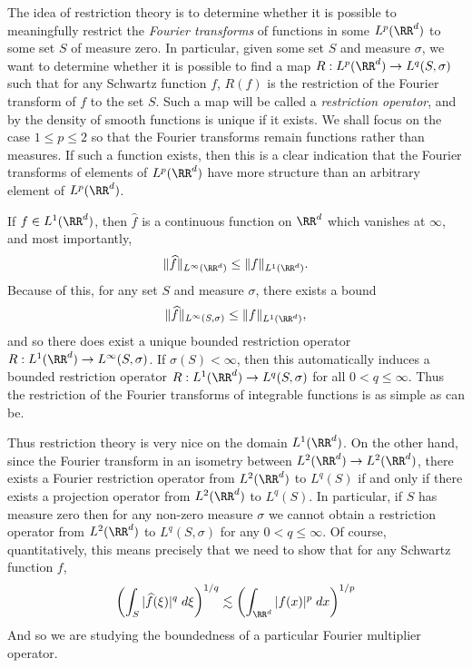 The idea of restriction theory is to determine whether it is possible to meaningfully restrict the \emph{Fourier transforms} of functions in some $L^p(\RR^d)$ to some set $S$ of measure zero. In particular, given some set $S$ and measure $\sigma$, we want to determine whether it is possible to find a map $R: L^p(\RR^d) \to L^q(S,\sigma)$ such that for any Schwartz function $f$, $R(f)$ is the restriction of the Fourier transform of $f$ to the set $S$. Such a map will be called a \emph{restriction operator}, and by the density of smooth functions is unique if it exists. We shall focus on the case $1 \leq p \leq 2$ so that the Fourier transforms remain functions rather than measures. If such a function exists, then this is a clear indication that the Fourier transforms of elements of $L^p(\RR^d)$ have more structure than an arbitrary element of $L^p(\RR^d)$.

\begin{example}
  If $f \in L^1(\RR^d)$, then $\widehat{f}$ is a continuous function on $\RR^d$ which vanishes at $\infty$, and most importantly,
  \[ \| \widehat{f} \|_{L^\infty(\RR^d)} \leq \| f \|_{L^1(\RR^d)}. \]
  Because of this, for any set $S$ and measure $\sigma$, there exists a bound
  \[ \| \widehat{f} \|_{L^\infty(S,\sigma)} \leq \| f \|_{L^1(\RR^d)}, \]
  and so there does exist a unique bounded restriction operator $R: L^1(\RR^d) \to L^\infty(S,\sigma)$. If $\sigma(S) < \infty$, then this automatically induces a bounded restriction operator $R: L^1(\RR^d) \to L^q(S,\sigma)$ for all $0 < q \leq \infty$. Thus the restriction of the Fourier transforms of integrable functions is as simple as can be.
\end{example}

Thus restriction theory is very nice on the domain $L^1(\RR^d)$. On the other hand, since the Fourier transform in an isometry between $L^2(\RR^d) \to L^2(\RR^d)$, there exists a Fourier restriction operator from $L^2(\RR^d)$ to $L^q(S)$ if and only if there exists a projection operator from $L^2(\RR^d)$ to $L^q(S)$. In particular, if $S$ has measure zero then for any non-zero measure $\sigma$ we cannot obtain a restriction operator from $L^2(\RR^d)$ to $L^q(S,\sigma)$ for any $0 < q \leq \infty$. Of course, quantitatively, this means precisely that we need to show that for any Schwartz function $f$,
%
\[ \left( \int_S |\widehat{f}(\xi)|^q\; d\xi \right)^{1/q} \lesssim \left( \int_{\RR^d} |f(x)|^p\; dx \right)^{1/p} \]
%
And so we are studying the boundedness of a particular Fourier multiplier operator.

